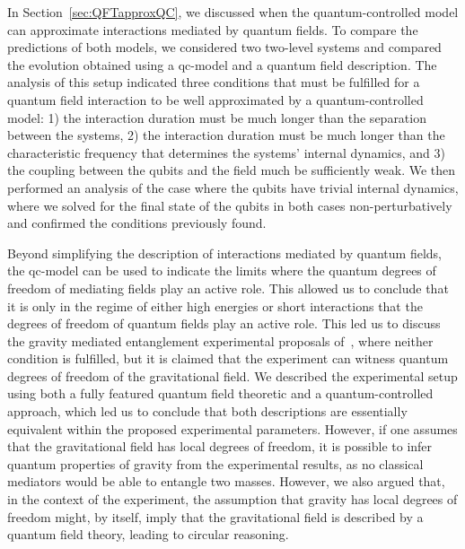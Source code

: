 \documentclass[letterpaper,12pt,titlepage,oneside,final]{book}
\begin{document}
In Section~\ref{sec:QFTapproxQC}, we discussed when the quantum-controlled model can approximate interactions mediated by quantum fields. To compare the predictions of both models, we considered two two-level systems and compared the evolution obtained using a qc-model and a quantum field description. The analysis of this setup indicated three conditions that must be fulfilled for a quantum field interaction to be well approximated by a quantum-controlled model: 1) the interaction duration must be much longer than the separation between the systems, 2) the interaction duration must be much longer than the characteristic frequency that determines the systems' internal dynamics, and 3) the coupling between the qubits and the field much be sufficiently weak. We then performed an analysis of the case where the qubits have trivial internal dynamics, where we solved for the final state of the qubits in both cases non-perturbatively and confirmed the conditions previously found. 

Beyond simplifying the description of interactions mediated by quantum fields, the qc-model can be used to indicate the limits where the quantum degrees of freedom of mediating fields play an active role. This allowed us to conclude that it is only in the regime of either high energies or short interactions that the degrees of freedom of quantum fields play an active role. This led us to discuss the gravity mediated entanglement experimental proposals of~\cite{B,MV}, where neither condition is fulfilled, but it is claimed that the experiment can witness quantum degrees of freedom of the gravitational field. We described the experimental setup using both a fully featured quantum field theoretic and a quantum-controlled approach, which led us to conclude that both descriptions are essentially equivalent within the proposed experimental parameters. However, if one assumes that the gravitational field has local degrees of freedom, it is possible to infer quantum properties of gravity from the experimental results, as no classical mediators would be able to entangle two masses. However, we also argued that, in the context of the experiment, the assumption that gravity has local degrees of freedom might, by itself, imply that the gravitational field is described by a quantum field theory, leading to circular reasoning.
\end{document}
